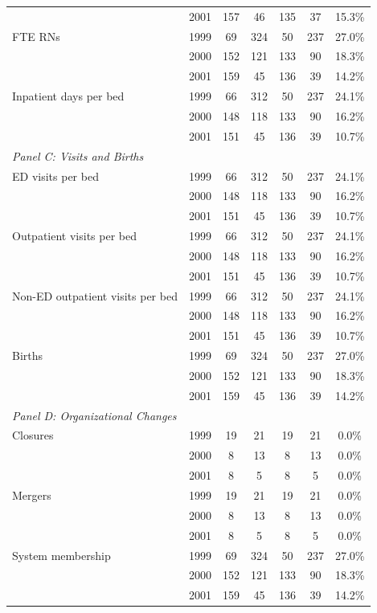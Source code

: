 \begin{tabular}{l c cc cc c}
 & 2001 & 157 & 46 & 135 & 37 & 15.3\% \\
FTE RNs & 1999 & 69 & 324 & 50 & 237 & 27.0\% \\
 & 2000 & 152 & 121 & 133 & 90 & 18.3\% \\
 & 2001 & 159 & 45 & 136 & 39 & 14.2\% \\
Inpatient days per bed & 1999 & 66 & 312 & 50 & 237 & 24.1\% \\
 & 2000 & 148 & 118 & 133 & 90 & 16.2\% \\
 & 2001 & 151 & 45 & 136 & 39 & 10.7\% \\
\midrule
\multicolumn{7}{l}{\textit{Panel C: Visits and Births}} \\
ED visits per bed & 1999 & 66 & 312 & 50 & 237 & 24.1\% \\
 & 2000 & 148 & 118 & 133 & 90 & 16.2\% \\
 & 2001 & 151 & 45 & 136 & 39 & 10.7\% \\
Outpatient visits per bed & 1999 & 66 & 312 & 50 & 237 & 24.1\% \\
 & 2000 & 148 & 118 & 133 & 90 & 16.2\% \\
 & 2001 & 151 & 45 & 136 & 39 & 10.7\% \\
Non-ED outpatient visits per bed & 1999 & 66 & 312 & 50 & 237 & 24.1\% \\
 & 2000 & 148 & 118 & 133 & 90 & 16.2\% \\
 & 2001 & 151 & 45 & 136 & 39 & 10.7\% \\
Births & 1999 & 69 & 324 & 50 & 237 & 27.0\% \\
 & 2000 & 152 & 121 & 133 & 90 & 18.3\% \\
 & 2001 & 159 & 45 & 136 & 39 & 14.2\% \\
\midrule
\multicolumn{7}{l}{\textit{Panel D: Organizational Changes}} \\
Closures & 1999 & 19 & 21 & 19 & 21 & 0.0\% \\
 & 2000 & 8 & 13 & 8 & 13 & 0.0\% \\
 & 2001 & 8 & 5 & 8 & 5 & 0.0\% \\
Mergers & 1999 & 19 & 21 & 19 & 21 & 0.0\% \\
 & 2000 & 8 & 13 & 8 & 13 & 0.0\% \\
 & 2001 & 8 & 5 & 8 & 5 & 0.0\% \\
System membership & 1999 & 69 & 324 & 50 & 237 & 27.0\% \\
 & 2000 & 152 & 121 & 133 & 90 & 18.3\% \\
 & 2001 & 159 & 45 & 136 & 39 & 14.2\% \\
\bottomrule
\end{tabular}
